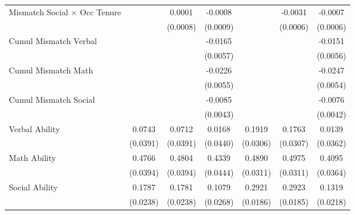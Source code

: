 {\begin{longtable}{l*{6}{c}}
Mismatch Social $\times$ Occ Tenure&                     &      0.0001         &     -0.0008         &                     &     -0.0031\sym{***}&     -0.0007         \\
                    &                     &    (0.0008)         &    (0.0009)         &                     &    (0.0006)         &    (0.0006)         \\
Cumul Mismatch Verbal&                     &                     &     -0.0165\sym{***}&                     &                     &     -0.0151\sym{***}\\
                    &                     &                     &    (0.0057)         &                     &                     &    (0.0056)         \\
Cumul Mismatch Math &                     &                     &     -0.0226\sym{***}&                     &                     &     -0.0247\sym{***}\\
                    &                     &                     &    (0.0055)         &                     &                     &    (0.0054)         \\
Cumul Mismatch Social&                     &                     &     -0.0085\sym{**} &                     &                     &     -0.0076\sym{*}  \\
                    &                     &                     &    (0.0043)         &                     &                     &    (0.0042)         \\
Verbal Ability      &      0.0743\sym{*}  &      0.0712\sym{*}  &      0.0168         &      0.1919\sym{***}&      0.1763\sym{***}&      0.0139         \\
                    &    (0.0391)         &    (0.0391)         &    (0.0440)         &    (0.0306)         &    (0.0307)         &    (0.0362)         \\
Math Ability        &      0.4766\sym{***}&      0.4804\sym{***}&      0.4339\sym{***}&      0.4890\sym{***}&      0.4975\sym{***}&      0.4095\sym{***}\\
                    &    (0.0394)         &    (0.0394)         &    (0.0444)         &    (0.0311)         &    (0.0311)         &    (0.0364)         \\
Social Ability      &      0.1787\sym{***}&      0.1781\sym{***}&      0.1079\sym{***}&      0.2921\sym{***}&      0.2923\sym{***}&      0.1319\sym{***}\\
                    &    (0.0238)         &    (0.0238)         &    (0.0268)         &    (0.0186)         &    (0.0185)         &    (0.0218)         \\

\end{longtable}}
